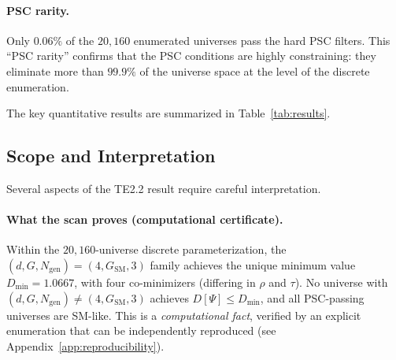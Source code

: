 \documentclass[11pt,twocolumn]{article}
\theoremstyle{remark}
\begin{document}
\paragraph{PSC rarity.}
Only $0.06\%$ of the $20{,}160$ enumerated universes pass the hard
PSC filters.
This ``PSC rarity'' confirms that the PSC conditions are highly
constraining: they eliminate more than $99.9\%$ of the universe
space at the level of the discrete enumeration.

The key quantitative results are summarized in
Table~\ref{tab:results}.

\begin{table}[htbp]
\centering
\caption{TE2.2 scan summary statistics}
\label{tab:results}
\end{table}

\subsection{Scope and Interpretation}
\label{sec:scope}

Several aspects of the TE2.2 result require careful interpretation.

\paragraph{What the scan proves (computational certificate).}
Within the $20{,}160$-universe discrete parameterization, the
$(d,G,N_{\mathrm{gen}})=(4,G_{\mathrm{SM}},3)$ family achieves the
unique minimum value $D_{\min}=1.0667$, with four co-minimizers
(differing in $\rho$ and $\tau$).
No universe with $(d,G,N_{\mathrm{gen}})\neq(4,G_{\mathrm{SM}},3)$
achieves $D[\Psi]\leq D_{\min}$, and all PSC-passing universes are
SM-like.
This is a \emph{computational fact}, verified by an explicit
enumeration that can be independently reproduced
(see Appendix~\ref{app:reproducibility}).
\end{document}
